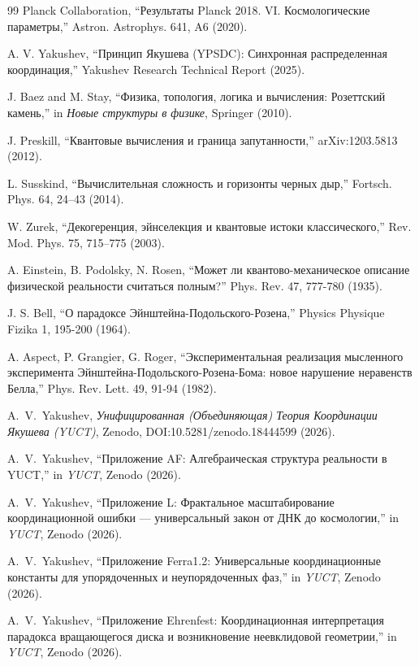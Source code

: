 \documentclass[11pt,a4paper]{article}
\begin{document}
\begin{thebibliography}{99}
		 Planck Collaboration, ``Результаты Planck 2018. VI. Космологические параметры,'' Astron. Astrophys. 641, A6 (2020).
		
		 A. V. Yakushev, ``Принцип Якушева (YPSDC): Синхронная распределенная координация,'' Yakushev Research Technical Report (2025).
		
		 J. Baez and M. Stay, ``Физика, топология, логика и вычисления: Розеттский камень,'' in \emph{Новые структуры в физике}, Springer (2010).
		
		 J. Preskill, ``Квантовые вычисления и граница запутанности,'' arXiv:1203.5813 (2012).
		
		 L. Susskind, ``Вычислительная сложность и горизонты черных дыр,'' Fortsch. Phys. 64, 24–43 (2014).
		
		 W. Zurek, ``Декогеренция, эйнселекция и квантовые истоки классического,'' Rev. Mod. Phys. 75, 715–775 (2003).
		
		 A. Einstein, B. Podolsky, N. Rosen, ``Может ли квантово-механическое описание физической реальности считаться полным?'' Phys. Rev. 47, 777-780 (1935).
		
		 J. S. Bell, ``О парадоксе Эйнштейна-Подольского-Розена,'' Physics Physique Fizika 1, 195-200 (1964).
		
		 A. Aspect, P. Grangier, G. Roger, ``Экспериментальная реализация мысленного эксперимента Эйнштейна-Подольского-Розена-Бома: новое нарушение неравенств Белла,'' Phys. Rev. Lett. 49, 91-94 (1982).
		
		A.~V.~Yakushev, \emph{Унифицированная (Объединяющая) Теория Координации Якушева (YUCT)}, Zenodo, DOI:10.5281/zenodo.18444599 (2026).
		
		A.~V.~Yakushev, ``Приложение AF: Алгебраическая структура реальности в YUCT,'' in \emph{YUCT}, Zenodo (2026).
		
		A.~V.~Yakushev, ``Приложение L: Фрактальное масштабирование координационной ошибки — универсальный закон от ДНК до космологии,'' in \emph{YUCT}, Zenodo (2026).
		
		A.~V.~Yakushev, ``Приложение Ferra1.2: Универсальные координационные константы для упорядоченных и неупорядоченных фаз,'' in \emph{YUCT}, Zenodo (2026).
		
		A.~V.~Yakushev, ``Приложение Ehrenfest: Координационная интерпретация парадокса вращающегося диска и возникновение неевклидовой геометрии,'' in \emph{YUCT}, Zenodo (2026).
		

\end{thebibliography}
\end{document}
